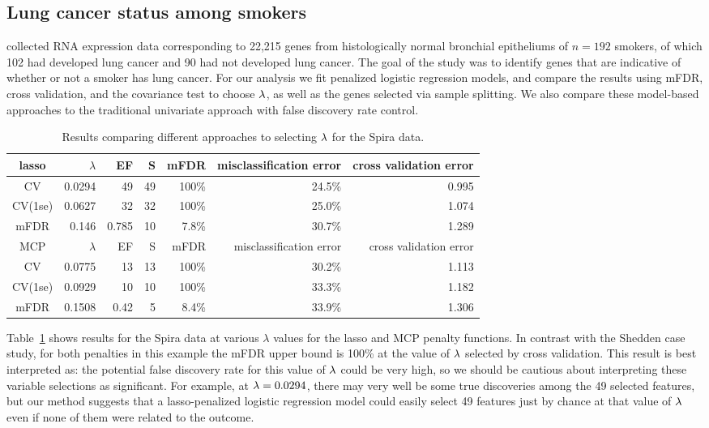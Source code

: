 \subsection{Lung cancer status among smokers}

\citet{Spira2007} collected RNA expression data corresponding to 22,215 genes from histologically normal bronchial epitheliums of $n = 192$ smokers, of which 102 had developed lung cancer and 90 had not developed lung cancer.
The goal of the study was to identify genes that are indicative of whether or not a smoker has lung cancer.  For our analysis we fit penalized logistic regression models, and compare the results using mFDR, cross validation, and the covariance test to choose $\lambda$, as well as the genes selected via sample splitting.   We also compare these model-based approaches to the traditional univariate approach with false discovery rate control.

\begin{table}[htb!]
\centering
\begin{tabular}{c | r r r r r r }
  \hline
lasso & $\lambda$ & EF & S & mFDR & misclassification error & cross validation error \\ 
	\hline
	CV & 0.0294 & 49 & 49 & 100\% & 24.5\% & 0.995 \\
	CV(1se) & 0.0627 & 32 & 32 & 100\% & 25.0\% & 1.074 \\
	mFDR & 0.146 & 0.785 & 10 & 7.8\% &  30.7\% & 1.289 \\
\hline
MCP & $\lambda$ & EF & S & mFDR & misclassification error & cross validation error \\
	\hline
	CV & 0.0775 & 13 & 13 & 100\% & 30.2\% & 1.113 \\
	CV(1se) & 0.0929 & 10 & 10 & 100\% & 33.3\% & 1.182 \\
	mFDR & 0.1508 & 0.42 & 5 & 8.4\% &  33.9\% & 1.306 \\
		\hline
\end{tabular}
\caption{\label{Tab:spira} Results comparing different approaches to selecting $\lambda$ for the Spira data.}
\end{table}

Table~\ref{Tab:spira} shows results for the Spira data at various $\lambda$ values for the lasso and MCP penalty functions.  In contrast with the Shedden case study, for both penalties in this example the mFDR upper bound is 100\% at the value of $\lambda$ selected by cross validation.  This result is best interpreted as: the potential false discovery rate for this value of $\lambda$ could be very high, so we should be cautious about interpreting these variable selections as significant.  For example, at $\lambda=0.0294$, there may very well be some true discoveries among the 49 selected features, but our method suggests that a lasso-penalized logistic regression model could easily select 49 features just by chance at that value of $\lambda$ even if none of them were related to the outcome.

